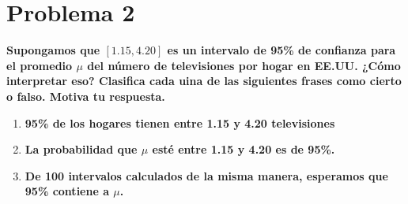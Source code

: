 \section*{Problema 2}

\textbf{Supongamos que $[1.15,4.20]$ es un intervalo de 95\% de confianza para el promedio $\mu$ del número de televisiones por hogar en EE.UU. ¿Cómo interpretar eso? Clasifica cada uina de las siguientes frases como cierto o falso. Motiva tu respuesta.}

\begin{enumerate}
    \item \textbf{95\% de los hogares tienen entre 1.15 y 4.20 televisiones}
    \item \textbf{La probabilidad que $\mu$ esté entre 1.15 y 4.20 es de 95\%.}
    \item \textbf{De 100 intervalos calculados de la misma manera, esperamos que 95\% contiene a $\mu$.}
\end{enumerate}